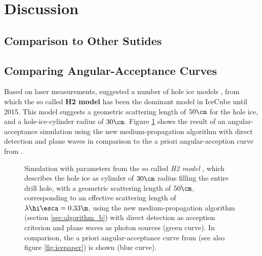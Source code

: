 
\section{Discussion}
\label{sec:discussion}

\subsection{Comparison to Other Sutides}
\label{sec:comparison}

\subsection{Comparing Angular-Acceptance Curves}
\label{sec:angular_acceptance_comparison}


Based on laser measurements,  suggested a number of hole ice models \cite{holeicestudieswithyag}, from which the so called \textbf{H2 model} has been the dominant model in IceCube until 2015. This model suggests a geometric scattering length of $50\cm$ for the hole ice, and a hole-ice-cylinder radius of $30\cm$. Figure \ref{fig:xaeg2Mee} shows the result of an angular-acceptance simulation using the new medium-propagation algorithm with direct detection and plane waves in comparison to the a priori angular-acception curve from \cite{icepaper}.

\begin{figure}[htbp]
  \caption{Simulation with parameters from the so called \textit{H2 model} \cite{holeicestudieswithyag}, which describes the hole ice as cylinder of $30\cm$ radius filling the entire drill hole, with a geometric scattering length of $50\cm$, corresponding to an effective scattering length of $\lambda\hi\esca = 0.33\m$, using the new medium-propagation algorithm (section \ref{sec:algorithm_b}) with direct detection as acception criterion and plane waves as photon sources (green curve). In comparison, the a priori angular-acceptance curve from \cite{icepaper} (see also figure \ref{fig:icepaper}) is shown (blue curve).}
  \label{fig:xaeg2Mee}
\end{figure}


